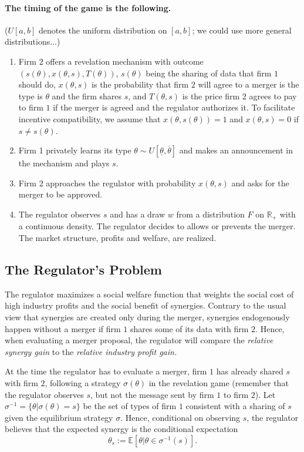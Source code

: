 \documentclass[a4paper]{article}
\newcommand{\E}{\mathbb E}
\renewcommand{\t}{\theta}
\begin{document}
\paragraph{The timing of the game is the following.} ($U[a,b]$ denotes the uniform distribution on $[a,b]$; we could use more general distributions...)
\begin{enumerate}\setlength\itemsep{0em}
    \item Firm $2$ offers a revelation mechanism with outcome $(s(\t),x(\t,s),T(\t))$, $s(\t)$ being the sharing of data that firm $1$ should do, $x(\t,s)$ is the probability that firm $2$ will agree to a merger is the type is $\t$ and the firm shares $s$, and $T(\t,s)$ is the price firm $2$ agrees to pay to firm $1$ if the merger is agreed and the regulator authorizes it. To facilitate incentive compatibility, we assume that $x(\t,s(\t))=1$ and $x(\t,s)=0$ if $s\neq s(\t)$.
    \item Firm 1 privately learns its type $\t\sim U[\underline{\t},\overline{\t}]$ and makes an announcement in the mechanism and plays $s$.
    \item Firm $2$ approaches the regulator with probability $x(\t,s)$ and asks for the merger to be approved.
    \item The regulator observes $s$ and has a draw $w$ from a distribution $F$ on $\mathbb R_+$ with a continuous density. The regulator decides to allows or prevents the merger. The market structure, profits and welfare, are realized.
\end{enumerate}
%
\subsection{The Regulator's Problem}
   The regulator maximizes a social welfare function that weights the social cost of high industry profits and the social benefit of synergies. Contrary to the usual view that synergies are created only during the merger, synergies endogenously happen without a merger if firm $1$ shares some of its data with firm $2$. Hence, when evaluating a merger proposal, the regulator will compare the \emph{relative synergy gain} to the \emph{relative industry profit gain.}

   At the time the regulator has to evaluate a merger, firm $1$ has already shared $s$ with firm $2$, following a strategy $\sigma(\t)$ in the revelation game (remember that the regulator observes $s$, but not the message sent by firm $1$ to firm $2$).  Let $\sigma^{-1}=\{\t|\sigma(\t)=s\}$ be the set of types of firm $1$ consistent with a sharing of $s$ given the equilibrium strategy $\sigma$. Hence, conditional on observing $s$, the regulator believes that the expected synergy is the conditional expectation $$\t_s:=\E[\t|\t\in\sigma^{-1}(s)].$$
     
\end{document}
